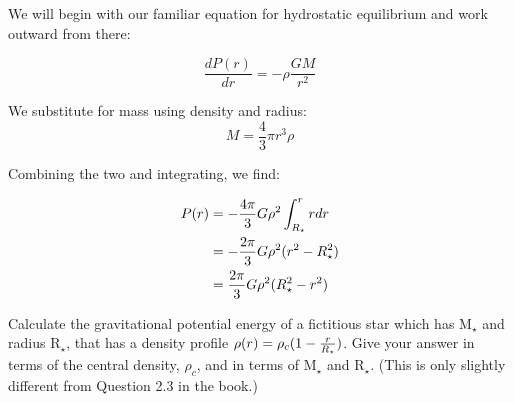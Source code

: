\documentclass[12pt]{article}
\newenvironment{problem}[2][Problem]{\begin{trivlist}
\item[\hskip \labelsep {\bfseries #1}\hskip \labelsep {\bfseries #2.}]}{\end{trivlist}}
\newenvironment{answer}[2][Answer]{\begin{trivlist}
\item[\hskip \labelsep {\bfseries #1}\hskip \labelsep {\bfseries #2.}]}{\end{trivlist}}
\begin{document}
\begin{answer}{4}

We will begin with our familiar equation for hydrostatic equilibrium and work outward from there:

\begin{equation}
  \frac{dP(r)}{dr} = -\rho \frac{GM}{r^2}
\end{equation}

We substitute for mass using density and radius:
\begin{equation}
  M = \frac{4}{3} \pi r^3 \rho
\end{equation}

Combining the two and integrating, we find:

\begin{align}
  P(r) &= - \frac{4 \pi}{3} G \rho^2 \int_{R_{\star}}^{r} r dr \notag \\
       &= - \frac{2 \pi}{3} G \rho^2 (r^2 - R_{\star}^2) \notag \\
       &= \frac{2 \pi}{3} G \rho^2 (R_{\star}^2 - r^2)
\end{align}

\end{answer}
\bigskip
\bigskip




\begin{problem}{5}
Calculate the gravitational potential energy of a fictitious star which has M$_\star$ and radius R$_\star$, that has a density profile $\rho(r) = {\rho_c (1 - {r \over R_\star})}$. Give your answer in terms of the central density, $\rho_c$, and in terms of M$_\star$ and R$_\star$. (This is only slightly different from Question 2.3 in the book.)
\end{problem}
\end{document}
